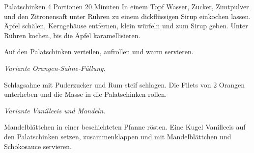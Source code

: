 \begin{recipe}{Palatschinken} {4 Portionen} {20 Minuten}
  In einem Topf Wasser, Zucker, Zimtpulver und den Zitronensaft unter Rühren zu einem dickflüssigen Sirup einkochen lassen.
  Äpfel schälen, Kerngehäuse entfernen, klein würfeln und zum Sirup geben.
  Unter Rühren kochen, bis die Äpfel karamellisieren.
  
  \newstep
  Auf den Palatschinken verteilen, aufrollen und warm servieren.

  \freeform
  \hrulefill

  \freeform
  \textit{Variante Orangen-Sahne-Füllung.}
  

  Schlagsahne mit Puderzucker und Rum steif schlagen.
  Die Filets von 2 Orangen unterheben und die Masse in die Palatschinken rollen.

  \freeform
  \hrulefill

  \freeform
  \textit{Variante Vanilleeis und Mandeln.}
  

  Mandelblättchen in einer beschichteten Pfanne rösten.
  Eine Kugel Vanilleeis auf den Palatschinken setzen, zusammenklappen und mit Mandelblättchen und Schokosauce servieren.

  \freeform
  \hrulefill
  
  \end{recipe}